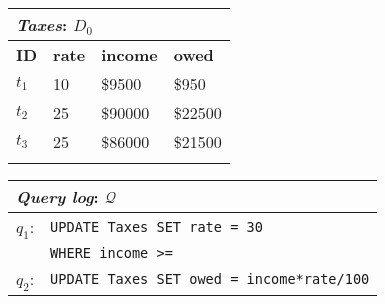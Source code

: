 

\begin{figure*}[t]
    \begin{minipage}[t]{0.28\textwidth}
         \vspace{0pt} 
         \centering
        \begin{tabular}{llll}
            \multicolumn{4}{l}{\emph{Taxes}: $D_0$}\\
            \toprule
            \textbf{ID}  & \textbf{rate}  & \textbf{income}    & \textbf{owed}\\
            \midrule
            $t_1$   & 10    & \$9500    & \$950\\
            $t_2$   & 25    & \$90000   & \$22500\\
            $t_3$   & 25    & \$86000   & \$21500\\
            \bottomrule
            \\
        \end{tabular}
    \end{minipage}
    \begin{minipage}[t]{0.43\textwidth}
         \vspace{0pt} 
         \centering
        \begin{tabular}{|p{1ex}l|}
            \multicolumn{2}{l}{\emph{Query log}: $\mathcal{Q}$}\\
            \hline
            $q_1$: & \texttt{\small UPDATE Taxes SET rate = 30}\\
                   & \texttt{\small WHERE income >= \color{red}{85700}} \\
            
            $q_2$: & \texttt{\small UPDATE Taxes SET owed = income*rate/100}\\
            

\end{tabular}
\end{minipage}
\end{figure*}
